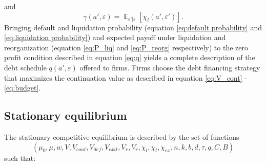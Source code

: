 \documentclass[12pt]{article}
\DeclareMathOperator{\E}{\mathbb{E}}
\begin{document}
and
\begin{equation} \label{eq:liquidation probability}
    \gamma(a',\varepsilon) = \E_{\varepsilon' |\varepsilon}[\chi_l(a',\varepsilon')].
\end{equation}
Bringing default and liquidation probability (equation \ref{eq:default probability} and \ref{eq:liquidation probability}) and expected payoff under liquidation and reorganization (equation \ref{eq:P_liq} and \ref{eq:P_reorg} respectively) to the zero profit condition described in equation \ref{eq:q} yields a complete description of the debt schedule $q(a', \varepsilon)$ offered to firms. Firms choose the debt financing strategy that maximizes the continuation value as described in equation \ref{eq:V_cont} - \ref{eq:budget}.

\subsection{Stationary equilibrium}\label{sec:eq}
The stationary competitive equilibrium is described by the set of functions
$$(\mu_0, \mu, w, V, V_{cont}, V_{def},  V_{exit}, V_r, V_r, \chi_l, \chi_l, \chi_{ex}, n,k,b,d,\tau,q, C, B)$$
such that: 
\end{document}
